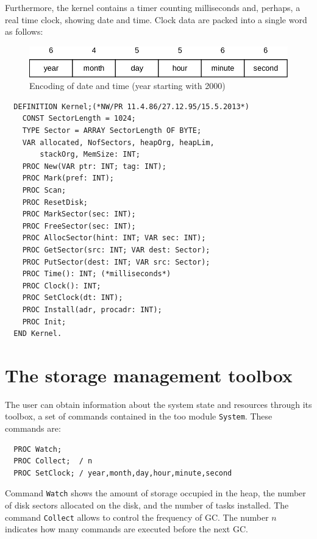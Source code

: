 Furthermore, the kernel contains a timer counting milliseconds and, perhaps, a real time
clock, showing date and time. Clock data are packed into a single word as follows:
\begin{figure}[h!]
  \label{fig:datetime}
  \centering
  \includegraphics[width=\textwidth]{i/y}
  \caption{Encoding of date and time (year starting with 2000)}
\end{figure}
\begin{verbatim}
  DEFINITION Kernel;(*NW/PR 11.4.86/27.12.95/15.5.2013*)
    CONST SectorLength = 1024;
    TYPE Sector = ARRAY SectorLength OF BYTE;
    VAR allocated, NofSectors, heapOrg, heapLim,
        stackOrg, MemSize: INT;
    PROC New(VAR ptr: INT; tag: INT);
    PROC Mark(pref: INT);
    PROC Scan;
    PROC ResetDisk;
    PROC MarkSector(sec: INT);
    PROC FreeSector(sec: INT);
    PROC AllocSector(hint: INT; VAR sec: INT);
    PROC GetSector(src: INT; VAR dest: Sector);
    PROC PutSector(dest: INT; VAR src: Sector);
    PROC Time(): INT; (*milliseconds*)
    PROC Clock(): INT;
    PROC SetClock(dt: INT);
    PROC Install(adr, procadr: INT);
    PROC Init;
  END Kernel.
\end{verbatim}

\section{The storage management toolbox}
The user can obtain information about the system state and resources through its toolbox,
a set of commands contained in the too module \verb|System|. These commands are:
\begin{verbatim}
  PROC Watch;
  PROC Collect;  / n
  PROC SetClock; / year,month,day,hour,minute,second
\end{verbatim}
Command \verb|Watch| shows the amount of storage occupied in the heap, the number of disk
sectors allocated on the disk, and the number of tasks installed. The command \verb|Collect|
allows to control the frequency of GC. The number $n$ indicates how many commands are
executed before the next GC.
